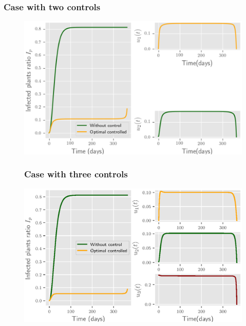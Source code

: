 	\begin{frame}
		\frametitle{Case with two controls}
		\begin{figure}
			\centering	
			\includegraphics[scale=0.5]{Feathergraphics/two_control_simulation_1.eps}
		\end{figure}	
	\end{frame}
	\begin{frame}
		\begin{figure}
			\frametitle{Case with three controls}
			\centering	
			\includegraphics[scale=0.5]{Feathergraphics/three_controls_simulation_1.eps}
		\end{figure}	
	\end{frame}
